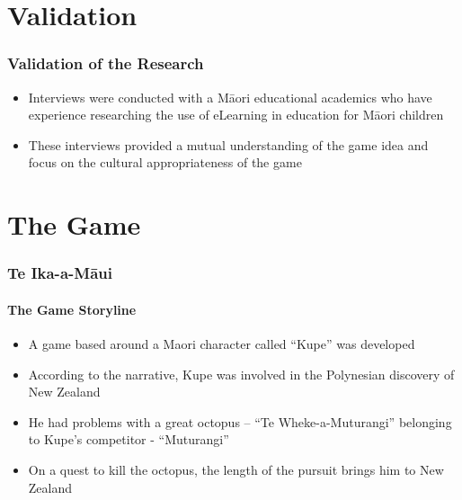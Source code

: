 \documentclass[aspectratio=169]{beamer}
\begin{document}
\section{Validation}
\begin{frame}
\frametitle{Validation of the Research}
\begin{itemize}
\item Interviews were conducted with a M\=aori educational academics who have experience researching the use of eLearning in education for M\=aori children
\newline
\item These interviews provided a mutual understanding of the game idea and focus on the cultural appropriateness of the game 
\end{itemize}
\end{frame}

\section{The Game}
\begin{frame}
\frametitle{Te Ika-a-Māui}
\framesubtitle{The Game Storyline}
\begin{itemize}
\item  A game based around a Maori character called “Kupe” was developed 
\newline
\item According to the narrative, Kupe was involved in the Polynesian discovery of New Zealand
\newline	
\item He had problems with a great octopus – “Te Wheke-a-Muturangi” belonging to Kupe's competitor - “Muturangi”
\newline	
\item On a quest to kill the octopus, the length of the pursuit brings him to New
Zealand	
\end{itemize}
\end{frame}
\end{document}
